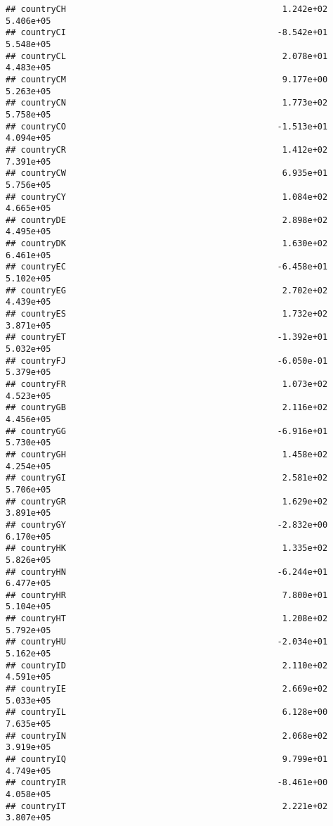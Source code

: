 \documentclass[
]{article}
\begin{document}
\begin{verbatim}
## countryCH                                           1.242e+02  5.406e+05
## countryCI                                          -8.542e+01  5.548e+05
## countryCL                                           2.078e+01  4.483e+05
## countryCM                                           9.177e+00  5.263e+05
## countryCN                                           1.773e+02  5.758e+05
## countryCO                                          -1.513e+01  4.094e+05
## countryCR                                           1.412e+02  7.391e+05
## countryCW                                           6.935e+01  5.756e+05
## countryCY                                           1.084e+02  4.665e+05
## countryDE                                           2.898e+02  4.495e+05
## countryDK                                           1.630e+02  6.461e+05
## countryEC                                          -6.458e+01  5.102e+05
## countryEG                                           2.702e+02  4.439e+05
## countryES                                           1.732e+02  3.871e+05
## countryET                                          -1.392e+01  5.032e+05
## countryFJ                                          -6.050e-01  5.379e+05
## countryFR                                           1.073e+02  4.523e+05
## countryGB                                           2.116e+02  4.456e+05
## countryGG                                          -6.916e+01  5.730e+05
## countryGH                                           1.458e+02  4.254e+05
## countryGI                                           2.581e+02  5.706e+05
## countryGR                                           1.629e+02  3.891e+05
## countryGY                                          -2.832e+00  6.170e+05
## countryHK                                           1.335e+02  5.826e+05
## countryHN                                          -6.244e+01  6.477e+05
## countryHR                                           7.800e+01  5.104e+05
## countryHT                                           1.208e+02  5.792e+05
## countryHU                                          -2.034e+01  5.162e+05
## countryID                                           2.110e+02  4.591e+05
## countryIE                                           2.669e+02  5.033e+05
## countryIL                                           6.128e+00  7.635e+05
## countryIN                                           2.068e+02  3.919e+05
## countryIQ                                           9.799e+01  4.749e+05
## countryIR                                          -8.461e+00  4.058e+05
## countryIT                                           2.221e+02  3.807e+05

\end{verbatim}
\end{document}
